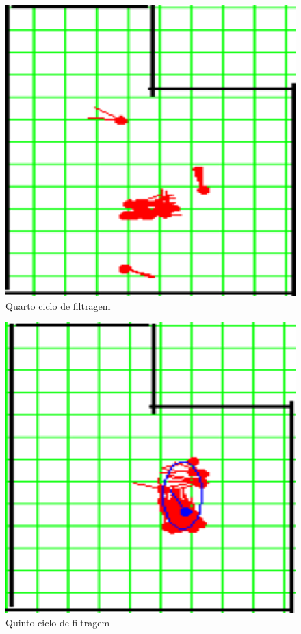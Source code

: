 \begin{figure}[H]
  \centering
  \includegraphics[scale=0.6]{figuras/cen1_ex4/5.eps}
  \caption[Quarto Ciclo de Filtragem]{Quarto ciclo de filtragem}
  \label{img:cen1_ex4_5}
\end{figure}

\begin{figure}[H]
  \centering
  \includegraphics[scale=0.6]{figuras/cen1_ex4/6.eps}
  \caption[Quinto Ciclo de Filtragem]{Quinto ciclo de filtragem}
  \label{img:cen1_ex4_6}
\end{figure}


